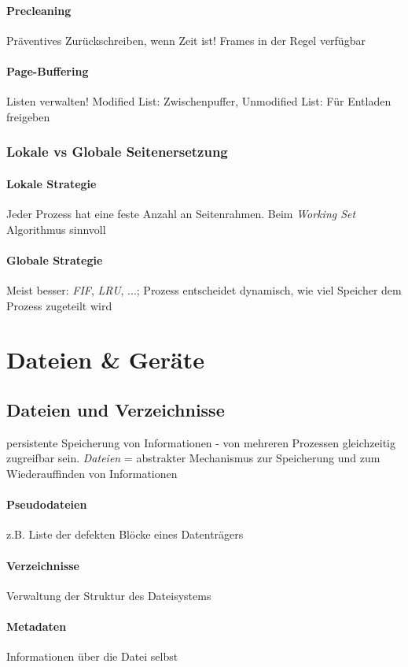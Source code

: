 \documentclass[11pt,a4paper,landscape]{article}
\begin{document}
\begin{multicols*}{3}
	\paragraph{Precleaning} Präventives Zurückschreiben, wenn Zeit ist! Frames in der Regel verfügbar
	\paragraph{Page-Buffering} Listen verwalten! Modified List: Zwischenpuffer, Unmodified List: Für Entladen freigeben
	\subsubsection{Lokale vs Globale Seitenersetzung}
	\paragraph{Lokale Strategie} Jeder Prozess hat eine feste Anzahl an Seitenrahmen. Beim \textit{Working Set} Algorithmus sinnvoll
	\paragraph{Globale Strategie} Meist besser: \textit{FIF}, \textit{LRU}, ...; Prozess entscheidet dynamisch, wie viel Speicher dem Prozess zugeteilt wird
	\section{Dateien \& Geräte}
	\subsection{Dateien und Verzeichnisse}
	persistente Speicherung von Informationen - von mehreren Prozessen gleichzeitig zugreifbar sein. \textit{Dateien} = abstrakter Mechanismus zur Speicherung und zum Wiederauffinden von Informationen
	\paragraph{Pseudodateien} z.B. Liste der defekten Blöcke eines Datenträgers
	\paragraph{Verzeichnisse} Verwaltung der Struktur des Dateisystems
	\paragraph{Metadaten} Informationen über die Datei selbst

\end{multicols*}
\end{document}
